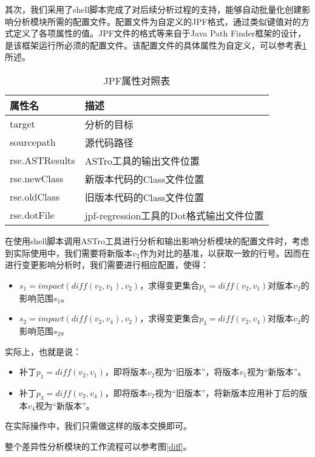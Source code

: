 其次，我们采用了shell脚本完成了对后续分析过程的支持，能够自动批量化创建影响分析模块所需的配置文件。配置文件为自定义的JPF格式，通过类似键值对的方式定义了各项属性的值。JPF文件的格式等来自于Java Path Finder框架的设计，是该框架运行所必须的配置文件。该配置文件的具体属性为自定义，可以参考表\ref {JPF_prop}所述。

\begin{table}
	\caption{JPF属性对照表}
	\label{JPF_prop}
	\centering
	    \begin{tabular*}{\linewidth}{lp{10cm}}
	    	\toprule[1.5pt]
	    	{\heiti 属性名} & {\heiti 描述} \\\midrule[1pt]
	    	target & 分析的目标 \\
	    	sourcepath & 源代码路径\\
	    	rse.ASTResults & ASTro工具的输出文件位置\\
	    	rse.newClass & 新版本代码的Class文件位置\\
	    	rse.oldClass    & 旧版本代码的Class文件位置\\
	    	rse.dotFile   & jpf-regression工具的Dot格式输出文件位置\\
	    	\bottomrule[1.5pt]
	    \end{tabular*}
\end{table}

在使用shell脚本调用ASTro工具进行分析和输出影响分析模块的配置文件时，考虑到实际使用中，我们需要将新版本$v_2$作为对比的基准，以获取一致的行号。因而在进行变更影响分析时，我们需要进行相应配置，使得：
\begin{itemize}
	\item $s_1 = impact(diff(v_2,v_1),v_2)$，求得变更集合$p_1 = diff(v_2,v_1)$对版本$v_2$的影响范围$s_1$。
	\item $s_2 = impact(diff(v_2,v_4),v_2)$，求得变更集合$p_3 = diff(v_2,v_4)$对版本$v_2$的影响范围$s_2$。
\end{itemize}

实际上，也就是说：
\begin{itemize}
	\item 补丁$p_1 = diff(v_2,v_1)$，即将版本$v_2$视为“旧版本”，将版本$v_1$视为“新版本”。
	\item 补丁$p_3 = diff(v_2,v_4)$，即将版本$v_2$视为“旧版本”，将新版本应用补丁后的版本$v_4$视为“新版本”。
\end{itemize}

在实际操作中，我们只需做这样的版本交换即可。

整个差异性分析模块的工作流程可以参考图\ref {diff}。


